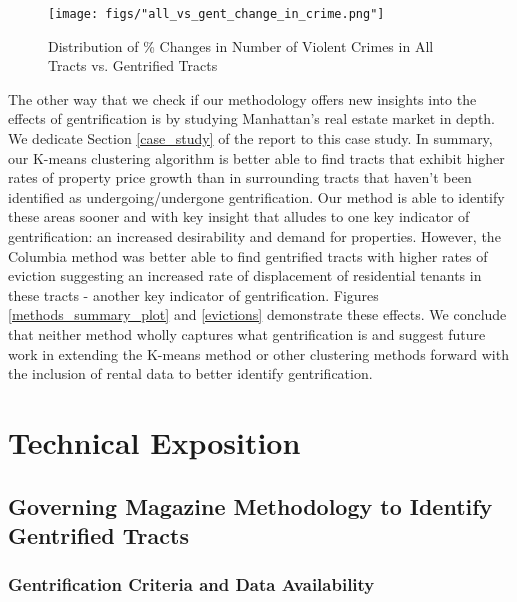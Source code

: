 \documentclass[a4paper, 12pt]{article}
\numberwithin{equation}{section}
\begin{document}
		\begin{figure}[H]
			\centering
			\texttt{[image: figs/"all\_vs\_gent\_change\_in\_crime.png"]}
			\caption{Distribution of \% Changes in Number of Violent Crimes  in All Tracts vs. Gentrified Tracts}
			\label{fig:crime}
		\end{figure}
		
	    The other way that we check if our methodology offers new insights into the effects of gentrification is by studying Manhattan's real estate market in depth. We dedicate Section \ref{case_study} of the report to this case study. In summary, our K-means clustering algorithm is better able to find tracts that exhibit higher rates of property price growth than in surrounding tracts that haven't been identified as undergoing/undergone gentrification. Our method is able to identify these areas sooner and with key insight that alludes to one key indicator of gentrification: an increased desirability and demand for properties. However, the Columbia method was better able to find gentrified tracts with higher rates of eviction suggesting an increased rate of displacement of residential tenants in these tracts - another key indicator of gentrification. Figures \ref{methods_summary_plot} and \ref{evictions} demonstrate these effects. We conclude that neither method wholly captures what gentrification is and suggest future work in extending the K-means method or other clustering methods forward with the inclusion of rental data to better identify gentrification. 
	    
	\newpage
	
	\section{Technical Exposition}
		
		\subsection{Governing Magazine Methodology to Identify Gentrified Tracts}
			
			\subsubsection{Gentrification Criteria and Data Availability}
			
\end{document}
